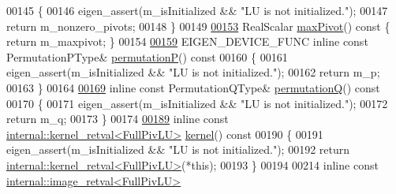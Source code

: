 \begin{DoxyCode}
00145 \textcolor{keyword}{    }\{
00146       eigen\_assert(m\_isInitialized && \textcolor{stringliteral}{"LU is not initialized."});
00147       \textcolor{keywordflow}{return} m\_nonzero\_pivots;
00148     \}
00149 
\hyperlink{group___l_u___module_abced9f280f5fc49c2e62605c782b237b}{00153}     RealScalar \hyperlink{group___l_u___module_abced9f280f5fc49c2e62605c782b237b}{maxPivot}()\textcolor{keyword}{ const }\{ \textcolor{keywordflow}{return} m\_maxpivot; \}
00154 
\hyperlink{group___l_u___module_a09274c82240f6441af5e6c99e24e756d}{00159}     EIGEN\_DEVICE\_FUNC \textcolor{keyword}{inline} \textcolor{keyword}{const} PermutationPType& \hyperlink{group___l_u___module_a09274c82240f6441af5e6c99e24e756d}{permutationP}()\textcolor{keyword}{ const}
00160 \textcolor{keyword}{    }\{
00161       eigen\_assert(m\_isInitialized && \textcolor{stringliteral}{"LU is not initialized."});
00162       \textcolor{keywordflow}{return} m\_p;
00163     \}
00164 
\hyperlink{group___l_u___module_a8d18190c7618de271cba7293f0493a36}{00169}     \textcolor{keyword}{inline} \textcolor{keyword}{const} PermutationQType& \hyperlink{group___l_u___module_a8d18190c7618de271cba7293f0493a36}{permutationQ}()\textcolor{keyword}{ const}
00170 \textcolor{keyword}{    }\{
00171       eigen\_assert(m\_isInitialized && \textcolor{stringliteral}{"LU is not initialized."});
00172       \textcolor{keywordflow}{return} m\_q;
00173     \}
00174 
\hyperlink{group___l_u___module_a70f52eeb2cd07dfbf790fce106fb4015}{00189}     \textcolor{keyword}{inline} \textcolor{keyword}{const} \hyperlink{struct_eigen_1_1internal_1_1kernel__retval}{internal::kernel\_retval<FullPivLU>} 
      \hyperlink{group___l_u___module_a70f52eeb2cd07dfbf790fce106fb4015}{kernel}()\textcolor{keyword}{ const}
00190 \textcolor{keyword}{    }\{
00191       eigen\_assert(m\_isInitialized && \textcolor{stringliteral}{"LU is not initialized."});
00192       \textcolor{keywordflow}{return} \hyperlink{struct_eigen_1_1internal_1_1kernel__retval}{internal::kernel\_retval<FullPivLU>}(*this);
00193     \}
00194 
00214     \textcolor{keyword}{inline} \textcolor{keyword}{const} \hyperlink{struct_eigen_1_1internal_1_1image__retval}{internal::image\_retval<FullPivLU>}

\end{DoxyCode}
